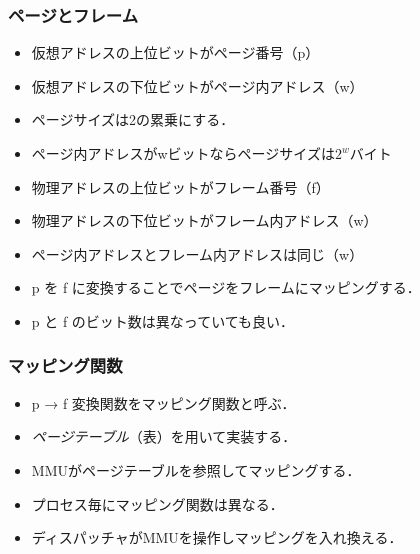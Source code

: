 \documentclass[unicode,handout]{beamer}                   %
\begin{document}
\begin{frame}
  \frametitle{ページとフレーム}
  \begin{itemize}
  \item 仮想アドレスの上位ビットがページ番号（p）
  \item 仮想アドレスの下位ビットがページ内アドレス（w）
  \item ページサイズは2の累乗にする．
  \item ページ内アドレスがwビットならページサイズは$2^w$バイト
  \item 物理アドレスの上位ビットがフレーム番号（f）
  \item 物理アドレスの下位ビットがフレーム内アドレス（w）
  \item ページ内アドレスとフレーム内アドレスは同じ（w）
  \item p を f に変換することでページをフレームにマッピングする．
  \item p と f のビット数は異なっていても良い．
  \end{itemize}
\end{frame}

\begin{frame}
  \frametitle{マッピング関数}
  \begin{itemize}
  \item p → f 変換関数をマッピング関数と呼ぶ．
  \item \emph{ページテーブル}（表）を用いて実装する．
  \item MMUがページテーブルを参照してマッピングする．
  \item プロセス毎にマッピング関数は異なる．
  \item ディスパッチャがMMUを操作しマッピングを入れ換える．
  \end{itemize}
\end{frame}
\end{document}
